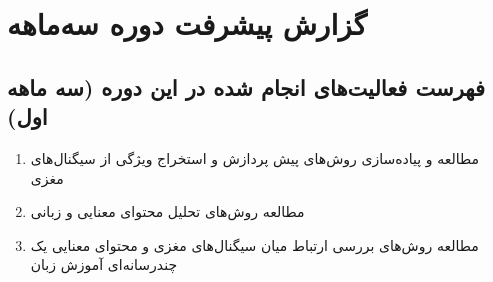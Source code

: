 \section{گزارش پیشرفت دوره سه‌ماهه}
\subsection{فهرست فعالیت‌های انجام شده در این دوره (سه ماهه اول)}
\begin{enumerate}
	\item مطالعه‌ و پیاده‌سازی روش‌های پیش پردازش و استخراج ویژگی از سیگنال‌های مغزی
	\item مطالعه روش‌های تحلیل محتوای معنایی و زبانی
	\item  مطالعه روش‌های بررسی ارتباط میان سیگنال‌های مغزی و محتوای معنایی یک چندرسانه‌ای آموزش زبان  
\end{enumerate}

